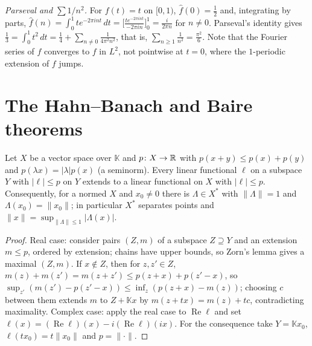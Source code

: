 \begin{example}\label{functional-analysis:example-basel}
\emph{Parseval and $\sum 1/n^2$.} For $f(t) = t$ on $[0, 1)$, $\hat f(0) = \frac12$ and, integrating by parts, $\hat f(n) = \int_0^1te^{-2\pi int}\,dt = \bigl[\frac{te^{-2\pi int}}{-2\pi in}\bigr]_0^1 = \frac{i}{2\pi n}$
for $n \neq 0$. Parseval's identity gives $\frac13 = \int_0^1t^2\,dt = \frac14 + \sum_{n \neq 0}\frac{1}{4\pi^2n^2}$, that is, $\sum_{n \geq 1}\frac1{n^2} = \frac{\pi^2}6$. Note that the Fourier series of $f$
converges to $f$ in $L^2$, not pointwise at $t = 0$, where the $1$-periodic extension of $f$ jumps.
\end{example}

\section{The Hahn--Banach and Baire theorems}\label{functional-analysis:section-hahn-banach}

\begin{theorem}\label{functional-analysis:theorem-hahn-banach}
Let $X$ be a vector space over $\mathbb{K}$ and $p \colon X \to \mathbb{R}$ with $p(x + y) \leq p(x) + p(y)$ and $p(\lambda x) = |\lambda|p(x)$ (a seminorm). Every linear functional $\ell$ on a subspace $Y$ with
$|\ell| \leq p$ on $Y$ extends to a linear functional on $X$ with $|\ell| \leq p$. Consequently, for a normed $X$ and $x_0 \neq 0$ there is $\Lambda \in X^*$ with $\|\Lambda\| = 1$ and $\Lambda(x_0) = \|x_0\|$;
in particular $X^*$ separates points and $\|x\| = \sup_{\|\Lambda\| \leq 1}|\Lambda(x)|$.
\end{theorem}

\begin{proof}
Real case: consider pairs $(Z, m)$ of a subspace $Z \supseteq Y$ and an extension $m \leq p$, ordered by extension; chains have upper bounds, so Zorn's lemma gives a maximal $(Z, m)$. If $x \notin Z$, then for
$z, z' \in Z$, $m(z) + m(z') = m(z + z') \leq p(z + x) + p(z' - x)$, so $\sup_{z'}(m(z') - p(z' - x)) \leq \inf_z(p(z + x) - m(z))$; choosing $c$ between them extends $m$ to $Z + \mathbb{K}x$ by $m(z + tx) = m(z) + tc$,
contradicting maximality. Complex case: apply the real case to $\operatorname{Re}\ell$ and set $\ell(x) = (\operatorname{Re}\ell)(x) - i(\operatorname{Re}\ell)(ix)$. For the consequence take
$Y = \mathbb{K}x_0$, $\ell(tx_0) = t\|x_0\|$ and $p = \|\cdot\|$.
\end{proof}

